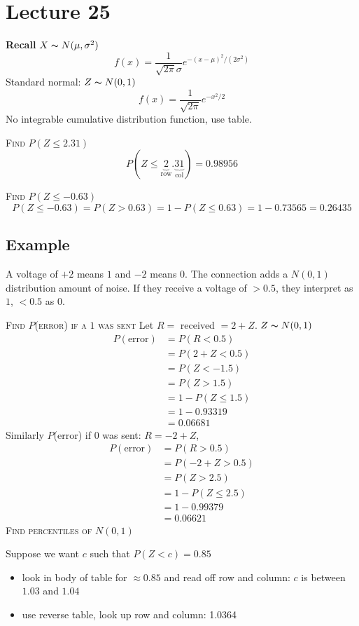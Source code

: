 \section{Lecture 25}
\textbf{Recall}
$ X \thicksim N(\mu,\sigma^2) $
\[ f(x)=\frac{1}{\sqrt{2\pi}\sigma}e^{-(x-\mu)^2/(2\sigma^2)}\]
Standard normal: $ Z \thicksim N(0,1) $
\[ f(x)=\frac{1}{\sqrt{2\pi}}e^{-x^2/2}\]
No integrable cumulative distribution function, use table.

\textsc{Find $ P(Z\le 2.31) $}
\[ P(Z\le \underbrace{2}_{\text{row}}.\underbrace{31}_{\text{col}})=0.98956 \]

\textsc{Find $ P(Z\le-0.63) $}
\[ P(Z\le-0.63)=P(Z>0.63)=1-P(Z\le 0.63)=1-0.73565=0.26435\]

\subsection{Example}
A voltage of $ +2 $ means $ 1 $ and $ -2 $ means $ 0 $. The connection
adds a $ N(0,1) $ distribution amount of noise. If they receive a voltage of
$ >0.5 $, they interpret as $ 1 $, $ <0.5 $ as $ 0 $.

\textsc{Find $ P $(error) if a $ 1 $ was sent}
Let $ R = $ received $ =2+Z $. $ Z \thicksim N(0,1) $
\begin{align*}
    P(\text{error})&=P(R<0.5)\\
    &=P(2+Z<0.5)\\
    &=P(Z<-1.5)\\
    &=P(Z> 1.5)\\
    &=1-P(Z\le 1.5)\\
    &=1-0.93319\\
    &=0.06681
\end{align*}
Similarly $ P $(error) if $ 0 $ was sent: $ R=-2+Z $,
\begin{align*}
    P(\text{error})&=P(R>0.5)\\
    &=P(-2+Z>0.5)\\
    &=P(Z>2.5)\\
    &=1-P(Z\le 2.5)\\
    &=1-0.99379\\
    &=0.06621
\end{align*}
\textsc{Find percentiles of $ N(0,1) $}

Suppose we want $ c $ such that $ P(Z<c)=0.85 $
\begin{itemize}
    \item look in body of table for $ \approx 0.85 $ and read off row and column: $ c $ is between $ 1.03 $ and $ 1.04 $
    \item use reverse table, look up row and column: 1.0364
\end{itemize}

